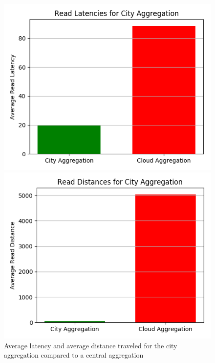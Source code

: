 \begin{figure}[H]
\begin{minipage}{0.49\textwidth}
\centering
\includegraphics[width=1\linewidth]{Figures/Evaluation/read-by-latency-City-Aggregation.png}
\end{minipage}
\hfill
\begin{minipage}{0.49\textwidth}
\centering
\includegraphics[width=1\linewidth]{Figures/Evaluation/read-by-distance-City-Aggregation.png}
\end{minipage}
\label{fig:read-by-city}
\caption{Average latency and average distance traveled for the city aggregation compared to a central aggregation}
\end{figure}

